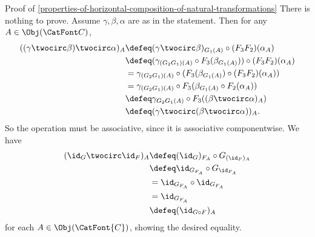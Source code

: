 \begin{Proof}{Proof of \cref{properties-of-horizontal-composition-of-natural-transformations}}%
    There is nothing to prove.
    Assume $\gamma, \beta, \alpha$ are as in the statement. Then for any $A \in \Obj(\CatFont C)$,
    \begin{align*}
      ((\gamma \twocirc \beta) \twocirc \alpha)_A &\defeq (\gamma \twocirc \beta)_{G_1(A)} \circ (F_3F_2)(\alpha_A)\\
      &\defeq (\gamma_{(G_2G_1)(A)} \circ F_3(\beta_{G_1(A)})) \circ (F_3F_2)(\alpha_A)\\
      &= \gamma_{(G_2G_1)(A)} \circ (F_3(\beta_{G_1(A)}) \circ (F_3F_2)(\alpha_A))\\
      &= \gamma_{(G_2G_1)(A)} \circ F_3(\beta_{G_1(A)} \circ F_2(\alpha_A))\\
      &\defeq \gamma_{G_2G_1(A)} \circ F_3((\beta \twocirc \alpha)_A)\\
      &\defeq(\gamma \twocirc (\beta \twocirc \alpha))_A.
    \end{align*}
    So the operation must be associative, since it is associative componentwise.
    We have
    \begin{align*}
        (\id_{G}\twocirc\id_{F})_{A} &\defeq (\id_{G})_{F_{A}}\circ G_{(\id_{F})_{A}}\\
                                     &\defeq \id_{G_{F_{A}}}\circ   G_{\id_{F_{A}}}\\
                                     &=      \id_{G_{F_{A}}}\circ\id_{G_{F_{A}}}\\
                                     &=      \id_{G_{F_{A}}}\\
                                     &\defeq (\id_{G\circ F})_{A}
    \end{align*}
    for each $A\in\Obj(\CatFont{C})$, showing the desired equality.


\end{Proof}
